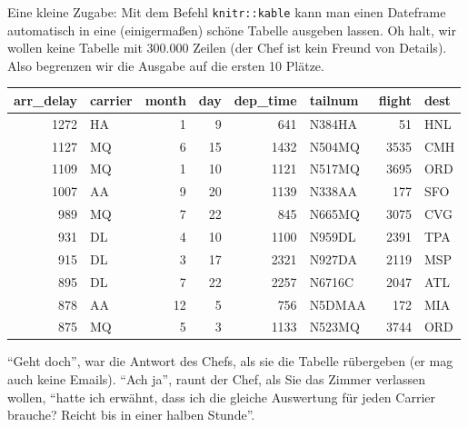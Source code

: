 \documentclass[12pt,]{book}
\newenvironment{Shaded}{\begin{snugshade}}{\end{snugshade}}
\newcommand{\KeywordTok}[1]{\textcolor[rgb]{0.13,0.29,0.53}{\textbf{{#1}}}}
\newcommand{\DecValTok}[1]{\textcolor[rgb]{0.00,0.00,0.81}{{#1}}}
\newcommand{\StringTok}[1]{\textcolor[rgb]{0.31,0.60,0.02}{{#1}}}
\newcommand{\NormalTok}[1]{{#1}}
\begin{document}
Eine kleine Zugabe: Mit dem Befehl \texttt{knitr::kable} kann man einen
Dateframe automatisch in eine (einigermaßen) schöne Tabelle ausgeben
lassen. Oh halt, wir wollen keine Tabelle mit 300.000 Zeilen (der Chef
ist kein Freund von Details). Also begrenzen wir die Ausgabe auf die
ersten 10 Plätze.

\begin{Shaded}
\end{Shaded}

\begin{tabular}{r|l|r|r|r|l|r|l}
\hline
arr\_delay & carrier & month & day & dep\_time & tailnum & flight & dest\\
\hline
1272 & HA & 1 & 9 & 641 & N384HA & 51 & HNL\\
\hline
1127 & MQ & 6 & 15 & 1432 & N504MQ & 3535 & CMH\\
\hline
1109 & MQ & 1 & 10 & 1121 & N517MQ & 3695 & ORD\\
\hline
1007 & AA & 9 & 20 & 1139 & N338AA & 177 & SFO\\
\hline
989 & MQ & 7 & 22 & 845 & N665MQ & 3075 & CVG\\
\hline
931 & DL & 4 & 10 & 1100 & N959DL & 2391 & TPA\\
\hline
915 & DL & 3 & 17 & 2321 & N927DA & 2119 & MSP\\
\hline
895 & DL & 7 & 22 & 2257 & N6716C & 2047 & ATL\\
\hline
878 & AA & 12 & 5 & 756 & N5DMAA & 172 & MIA\\
\hline
875 & MQ & 5 & 3 & 1133 & N523MQ & 3744 & ORD\\
\hline
\end{tabular}

``Geht doch'', war die Antwort des Chefs, als sie die Tabelle rübergeben
(er mag auch keine Emails). ``Ach ja'', raunt der Chef, als Sie das
Zimmer verlassen wollen, ``hatte ich erwähnt, dass ich die gleiche
Auswertung für jeden Carrier brauche? Reicht bis in einer halben
Stunde''.
\end{document}
